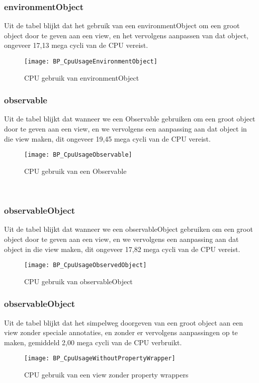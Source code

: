 \subsubsection{environmentObject}
Uit de tabel blijkt dat het gebruik van een environmentObject om een groot object door te geven aan een view, en het vervolgens aanpassen van dat object, ongeveer 17,13 mega cycli van de CPU vereist.
\begin{figure}[htbp]
    \centering
    \texttt{[image: BP\_CpuUsageEnvironmentObject]} 
    \caption{CPU gebruik van environmentObject}
    \label{fig:cpuEnvironmentObject}
\end{figure}

\subsubsection{observable}
Uit de tabel blijkt dat wanneer we een Observable gebruiken om een groot object door te geven aan een view, en we vervolgens een aanpassing aan dat object in die view maken, dit ongeveer 19,45 mega cycli van de CPU vereist.
\begin{figure}[htbp]
    \centering
    \texttt{[image: BP\_CpuUsageObservable]} 
    \caption{CPU gebruik van een Observable}
    \label{fig:cpuObservable}
\end{figure}\

\subsubsection{observableObject}
Uit de tabel blijkt dat wanneer we een observableObject gebruiken om een groot object door te geven aan een view, en we vervolgens een aanpassing aan dat object in die view maken, dit ongeveer 17,82 mega cycli van de CPU vereist.
\begin{figure}[htbp]
    \centering
    \texttt{[image: BP\_CpuUsageObservedObject]} 
    \caption{CPU gebruik van observableObject}
    \label{fig:cpuObservedObject}
\end{figure}

\subsubsection{observableObject}
Uit de tabel blijkt dat het simpelweg doorgeven van een groot object aan een view zonder speciale annotaties, en zonder er vervolgens aanpassingen op te maken, gemiddeld 2,00 mega cycli van de CPU verbruikt.
\begin{figure}[htbp]
    \centering
    \texttt{[image: BP\_CpuUsageWithoutPropertyWrapper]} 
    \caption{CPU gebruik van een view zonder property wrappers}
    \label{fig:cpuWithoutPropertyWrapper}
\end{figure}


